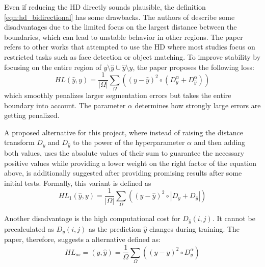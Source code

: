 Even if reducing the \ac{HD} directly sounds plausible, the definition \ref{eqn:hd_bidirectional} has some drawbacks. The authors of \cite{8767031} describe some disadvantages due to the limited focus on the largest distance between the boundaries, which can lead to unstable behavior in other regions. The paper refers to other works that attempted to use the \ac{HD} where most studies focus on restricted tasks such as face detection or object matching. To improve stability by focusing on the entire region of $y\setminus\hat{y}\cup\hat{y}\setminus y$, the paper proposes the following loss:
\begin{equation}
    HL(\hat{y},y)=\frac{1}{|\Omega|}\sum_{\Omega}((y-\hat{y})^2\circ (D_y^{\alpha} + D_{\hat{y}}^{\alpha}))
    \label{eqn:hausdorff_loss}
\end{equation}
which smoothly penalizes larger segmentation errors but takes the entire boundary into account. The parameter $\alpha$ determines how strongly large errors are getting penalized.

A proposed alternative for this project, where instead of raising the distance transform $D_y$ and $D_{\hat{y}}$ to the power of the hyperparameter $\alpha$ and then adding both values, uses the absolute values of their sum to guarantee the necessary positive values while providing a lower weight on the right factor of the equation above, is additionally suggested after providing promising results after some initial tests. Formally, this variant is defined as
\begin{equation}
    HL_{1}(\hat{y},y)=\frac{1}{|\Omega|}\sum_{\Omega}((y-\hat{y})^2\circ |D_y + D_{\hat{y}}|)
    \label{eqn:hausdorff_loss_v2}
\end{equation}

Another disadvantage is the high computational cost for $D_{\hat{y}}(i,j)$. It cannot be precalculated as $D_{y}(i,j)$ as the prediction $\hat{y}$ changes during training. The paper, therefore, suggests a  alternative defined as:
\begin{equation}
    HL_{os}=(y,\hat{y})=\frac{1}{\Omega}\sum_{\Omega}((y-\hat{y})^2\circ D_y^{\alpha})
    \label{eq:one_sided_hd}
\end{equation}

